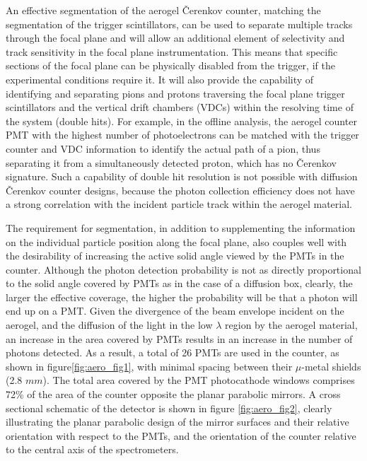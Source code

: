 An effective segmentation of the aerogel \v{C}erenkov counter, matching the 
segmentation of the trigger scintillators, can be used to separate multiple
tracks through the focal plane and will allow an additional element of
selectivity and track sensitivity in the focal plane instrumentation.  This
means that specific sections of the focal plane can be physically disabled from
the trigger, if the experimental conditions require it.  It will also provide
the capability of identifying and separating pions and protons traversing the
focal plane trigger scintillators and the vertical drift chambers (VDCs) within
the resolving time of the system (double hits).  
For example, in the offline analysis, the aerogel counter PMT with the highest 
number of photoelectrons can be matched with the trigger counter and 
VDC information to identify the actual path of a pion, 
thus separating it from a simultaneously detected proton, which
has no \v{C}erenkov signature.  
Such a capability of double hit resolution is not possible with diffusion 
\v{C}erenkov counter designs, because the photon collection efficiency does not 
have a strong correlation with the incident particle track within the aerogel material. 
 
The requirement for segmentation, in addition to supplementing the information
on the individual particle position along the focal plane, also couples well
with the desirability of increasing the active solid angle viewed by the PMTs
in the counter.  Although the photon detection probability is not as directly
proportional to the solid angle covered by PMTs as in the case of a diffusion
box, clearly, the larger the effective coverage, the higher the probability
will be that a photon will end up on a PMT.  Given the divergence of the beam
envelope incident on the aerogel, and the diffusion of the light in the low
$\lambda$ region by the aerogel material, an increase in the area covered by
PMTs results in an increase in the number of photons detected.  
As a result, a total of 26 PMTs are used in the counter, as shown in 
figure\ref{fig:aero_fig1}, with minimal spacing between their $\mu$-metal shields 
(2.8 $mm$).  
The total area covered by the PMT photocathode windows comprises 72\% of the area 
of the counter opposite the planar parabolic mirrors.  
A cross sectional schematic of the detector is shown in figure \ref{fig:aero_fig2}, 
clearly illustrating the planar parabolic design of the mirror surfaces and their 
relative orientation with respect to the PMTs, and the orientation of the counter 
relative to the central axis of the spectrometers. 
   
